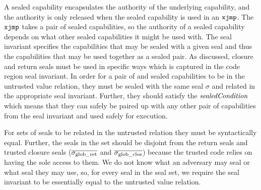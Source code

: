 \begin{jversion}
A sealed capability encapsulates the authority of the underlying capability, and the authority is only released when the sealed capability is used in an $\txjmp{}{}$.
The $\xjmp{}{}$ takes a pair of sealed capabilities, so the authority of a sealed capability depends on what other sealed capabilities it might be used with.
The seal invariant specifies the capabilities that may be sealed with a given seal and thus the capabilities that may be used together as a sealed pair.
As discussed, closure and return seals must be used in specific ways which is captured in the code region seal invariant.
In order for a pair of \srccm{} and \trgcm{} sealed capabilities to be in the untrusted value relation, they must be sealed with the same seal $\sigma$ and related in the appropriate seal invariant.
Further, they should satisfy the $\sealedCond[]{}$ which means that they can safely be paired up with any other pair of capabilities from the seal invariant and used safely for execution.

For sets of seals to be related in the untrusted relation they must be syntactically equal.
Further, the seals in the set should be disjoint from the return seals and trusted closure seals ($\overline{\sigma_{\mathrm{glob\_ret}}}$ and $\overline{\sigma_{\mathrm{glob\_clos}}}$) because the trusted code relies on having the sole access to them.
We do not know what an adversary may seal or what seal they may use, so, for every seal in the seal set, we require the seal invariant to be essentially equal to the untrusted value relation.


\end{jversion}
